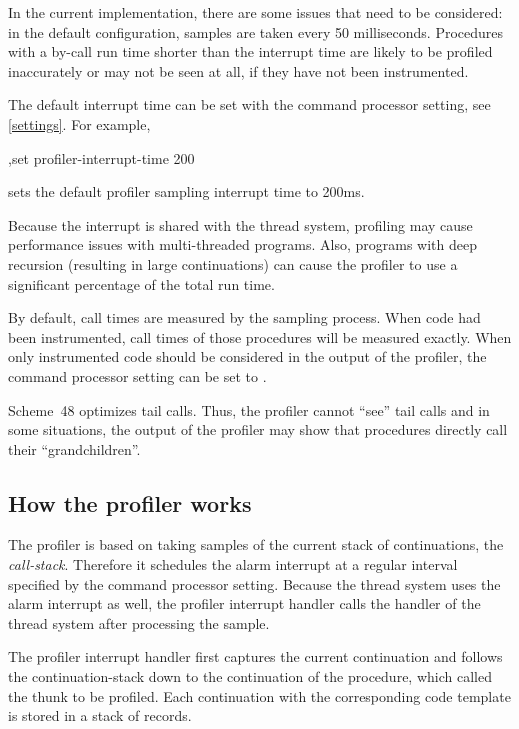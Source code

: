 In the current implementation, there are some issues that need to be considered:
in the default configuration, samples are taken every 50 milliseconds. Procedures with a by-call
run time shorter than the interrupt time are likely to be profiled inaccurately or may not be seen
at all, if they have not been instrumented.

The default interrupt time can be set with the  command processor setting,
see \ref{settings}. For example,
%
\begin{example}
,set profiler-interrupt-time 200
\end{example}
%
sets the
default profiler sampling interrupt time to 200ms.

Because the interrupt is shared with the thread system, profiling may cause performance issues
with multi-threaded programs. Also, programs with deep recursion (resulting in large
continuations) can cause the profiler to use a significant percentage of the total run time.

By default, call times are measured by the sampling process. When code had been instrumented,
call times of those procedures will be measured exactly. When only instrumented code should be
considered in the output of the profiler, the command processor setting
 can be set to .

Scheme~48 optimizes tail calls. Thus, the profiler cannot ``see''
tail calls and in some situations,
the output of the profiler may show that procedures directly call their ``grandchildren''.


\subsection{How the profiler works}

The profiler is based on taking samples of the current stack of continuations, the {\it call-stack}.
Therefore it schedules the alarm interrupt at a regular interval specified by the
 command processor setting. Because the thread system uses the
alarm interrupt as well, the profiler interrupt handler
calls the handler of the thread system after processing the sample.

The profiler interrupt handler first captures the current continuation and follows the continuation-stack
down to the continuation of the  procedure, which called the thunk to be profiled.
Each continuation with the corresponding code template is stored in a stack of  records.

